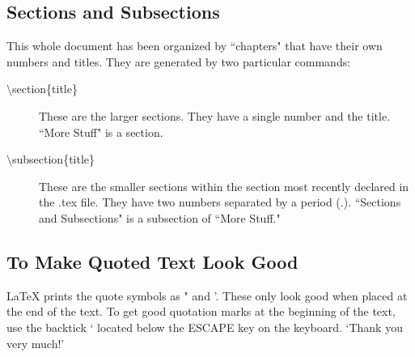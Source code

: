 \documentclass[10pt]{article}
\begin{document}
\subsection{Sections and Subsections\label{sectionInfo}}
This whole document has been organized by ``chapters" that have their own numbers and titles.  They are generated by two particular commands:
\begin{description}
\item[$ \setminus $section\{title\}] These are the larger sections.  They have a single number and the title.  ``More Stuff" is a section.
\item[$ \setminus $subsection\{title\}] These are the smaller sections within the section most recently declared in the .tex file.  They have two numbers separated by a period (.).  ``Sections and Subsections" is a subsection of ``More Stuff."
\end{description}
\subsection{To Make Quoted Text Look Good\label{quoteText}}
LaTeX prints the quote symbols as " and '.  These only look good when placed at the end of the text.  To get good quotation marks at the beginning of the text, use the backtick ` located below the ESCAPE key on the keyboard.  `Thank you very much!'
\end{document}

